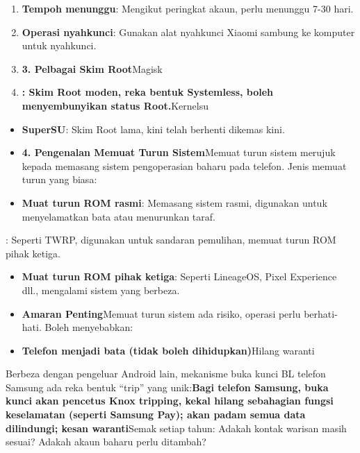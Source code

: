
\begin{enumerate}
  \item \textbf{Tempoh menunggu}: Mengikut peringkat akaun, perlu menunggu 7-30 hari.
  \item \textbf{Operasi nyahkunci}: Gunakan alat nyahkunci Xiaomi sambung ke komputer untuk nyahkunci.
  \item \textbf{3. Pelbagai Skim Root}Magisk
  \item \textbf{: Skim Root moden, reka bentuk Systemless, boleh menyembunyikan status Root.}Kernelsu
\end{enumerate}


\begin{itemize}
  \item \textbf{SuperSU}: Skim Root lama, kini telah berhenti dikemas kini.
  \item \textbf{4. Pengenalan Memuat Turun Sistem}Memuat turun sistem merujuk kepada memasang sistem pengoperasian baharu pada telefon. Jenis memuat turun yang biasa:
  \item \textbf{Muat turun ROM rasmi}: Memasang sistem rasmi, digunakan untuk menyelamatkan bata atau menurunkan taraf.
\end{itemize}


: Seperti TWRP, digunakan untuk sandaran pemulihan, memuat turun ROM pihak ketiga.

\begin{itemize}
  \item \textbf{Muat turun ROM pihak ketiga}: Seperti LineageOS, Pixel Experience dll., mengalami sistem yang berbeza.
  \item \textbf{Amaran Penting}Memuat turun sistem ada risiko, operasi perlu berhati-hati. Boleh menyebabkan:
  \item \textbf{Telefon menjadi bata (tidak boleh dihidupkan)}Hilang waranti
\end{itemize}


Berbeza dengan pengeluar Android lain, mekanisme buka kunci BL telefon Samsung ada reka bentuk “trip” yang unik:\textbf{Bagi telefon Samsung, buka kunci akan pencetus Knox tripping, kekal hilang sebahagian fungsi keselamatan (seperti Samsung Pay); akan padam semua data dilindungi; kesan waranti}Semak setiap tahun: Adakah kontak warisan masih sesuai? Adakah akaun baharu perlu ditambah?

